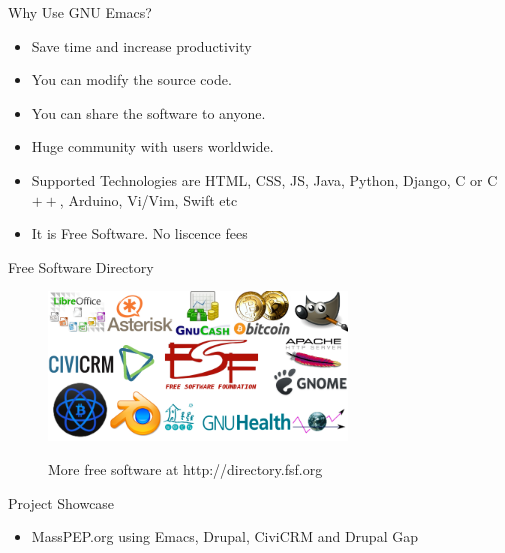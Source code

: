 \documentclass[english,14pt,presentation]{beamer}
\begin{document}
\begin{frame}{Why Use GNU Emacs?}
\begin{itemize}
\pause \item Save time and increase productivity
\pause \item You can modify the source code.
\pause \item You can share the software to anyone.
\pause \item Huge community with users worldwide.
\pause \item Supported Technologies are HTML, CSS, JS, Java, Python, Django, C or C$++$, Arduino, Vi/Vim, Swift etc
\pause \item It is Free Software. No liscence fees
\end{itemize}
\end{frame}

\begin{frame}{Free Software Directory}
\begin{figure}
\centering
\includegraphics[width=300]{images/fsf.png}
\item More free software at http://directory.fsf.org
\end{figure}
\end{frame}

\begin{frame}{Project Showcase}
\begin{itemize}
\pause \item MassPEP.org using Emacs, Drupal, CiviCRM and Drupal Gap
\end{itemize}
\end{frame}
\end{document}
